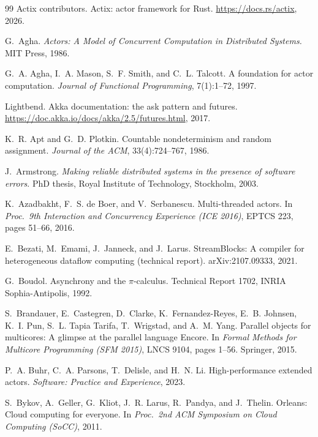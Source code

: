 \documentclass[11pt]{article}
\theoremstyle{definition}
\theoremstyle{remark}
\begin{document}
\begin{thebibliography}{99}
 Actix contributors. Actix: actor framework for Rust. \url{https://docs.rs/actix}, 2026.

 G.~Agha. \emph{Actors: A Model of Concurrent Computation in Distributed
  Systems.} MIT Press, 1986.

 G.~A. Agha, I.~A. Mason, S.~F. Smith, and C.~L. Talcott. A foundation
  for actor computation. \emph{Journal of Functional Programming}, 7(1):1--72, 1997.

 Lightbend. Akka documentation: the ask pattern and futures.
\url{https://doc.akka.io/docs/akka/2.5/futures.html}, 2017.

 K.~R. Apt and G.~D. Plotkin. Countable nondeterminism and random
assignment. \emph{Journal of the ACM}, 33(4):724--767, 1986.

 J.~Armstrong. \emph{Making reliable distributed systems in the
presence of software errors}. PhD thesis, Royal Institute of Technology, Stockholm, 2003.

 K.~Azadbakht, F.~S. de Boer, and V.~Serbanescu. Multi-threaded
actors. In \emph{Proc.\ 9th Interaction and Concurrency Experience (ICE 2016)}, EPTCS
223, pages 51--66, 2016.

 E.~Bezati, M.~Emami, J.~Janneck, and J.~Larus.
  StreamBlocks: A compiler for heterogeneous dataflow computing (technical report).
  arXiv:2107.09333, 2021.

 G.~Boudol. Asynchrony and the $\pi$-calculus. Technical Report 1702,
  INRIA Sophia-Antipolis, 1992.

 S.~Brandauer, E.~Castegren, D.~Clarke, K.~Fernandez-Reyes,
E.~B. Johnsen, K.~I. Pun, S.~L. Tapia Tarifa, T.~Wrigstad, and A.~M. Yang. Parallel
objects for multicores: A glimpse at the parallel language Encore. In \emph{Formal Methods
for Multicore Programming (SFM 2015)}, LNCS 9104, pages 1--56. Springer, 2015.

 P.~A. Buhr, C.~A. Parsons, T.~Delisle, and H.~N. Li.
High-performance extended actors. \emph{Software: Practice and Experience}, 2023.

 S.~Bykov, A.~Geller, G.~Kliot, J.~R. Larus, R.~Pandya, and
J.~Thelin. Orleans: Cloud computing for everyone. In \emph{Proc.\ 2nd ACM Symposium on
Cloud Computing (SoCC)}, 2011.


\end{thebibliography}
\end{document}
